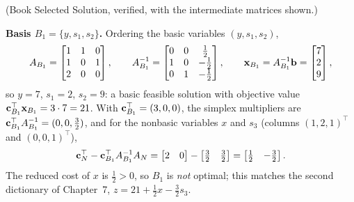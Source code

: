 
(Book Selected Solution, verified, with the intermediate matrices shown.)

\textbf{Basis $B_1 = \{y, s_1, s_2\}$.} Ordering the basic variables
$(y, s_1, s_2)$,
\[
A_{B_1} =
\begin{bmatrix}
1 & 1 & 0 \\
1 & 0 & 1 \\
2 & 0 & 0
\end{bmatrix},
\qquad
A_{B_1}^{-1} =
\begin{bmatrix}
0 & 0 & \tfrac12 \\
1 & 0 & -\tfrac12 \\
0 & 1 & -\tfrac12
\end{bmatrix},
\qquad
\mathbf{x}_{B_1} = A_{B_1}^{-1}\mathbf{b} = \begin{bmatrix} 7 \\ 2 \\ 9 \end{bmatrix},
\]
so $y = 7$, $s_1 = 2$, $s_2 = 9$: a basic feasible solution with objective
value $\mathbf{c}_{B_1}^\top \mathbf{x}_{B_1} = 3 \cdot 7 = 21$. With
$\mathbf{c}_{B_1}^\top = (3, 0, 0)$, the simplex multipliers are
$\mathbf{c}_{B_1}^\top A_{B_1}^{-1} = (0, 0, \tfrac32)$, and for the nonbasic
variables $x$ and $s_3$ (columns $(1,2,1)^\top$ and $(0,0,1)^\top$),
\[
\mathbf{c}_N^\top - \mathbf{c}_{B_1}^\top A_{B_1}^{-1} A_N
= \begin{bmatrix} 2 & 0 \end{bmatrix}
- \begin{bmatrix} \tfrac32 & \tfrac32 \end{bmatrix}
= \begin{bmatrix} \tfrac12 & -\tfrac32 \end{bmatrix}.
\]
The reduced cost of $x$ is $\tfrac12 > 0$, so $B_1$ is \emph{not}
optimal; this matches the second dictionary of Chapter~7,
$z = 21 + \tfrac12 x - \tfrac32 s_3$.

